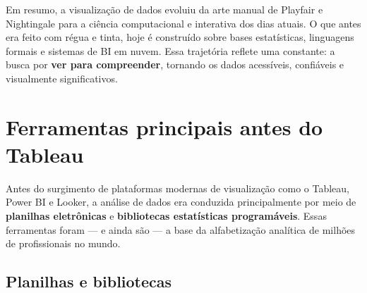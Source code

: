 \bigskip

Em resumo, a visualização de dados evoluiu da arte manual de Playfair e Nightingale para a ciência computacional e interativa dos dias atuais.  
O que antes era feito com régua e tinta, hoje é construído sobre bases estatísticas, linguagens formais e sistemas de BI em nuvem.  
Essa trajetória reflete uma constante: a busca por \textbf{ver para compreender}, tornando os dados acessíveis, confiáveis e visualmente significativos.



\section{Ferramentas principais antes do Tableau}

Antes do surgimento de plataformas modernas de visualização como o Tableau, Power BI e Looker, a análise de dados era conduzida principalmente por meio de \textbf{planilhas eletrônicas} e \textbf{bibliotecas estatísticas programáveis}. Essas ferramentas foram — e ainda são — a base da alfabetização analítica de milhões de profissionais no mundo.

\subsection*{Planilhas e bibliotecas}

